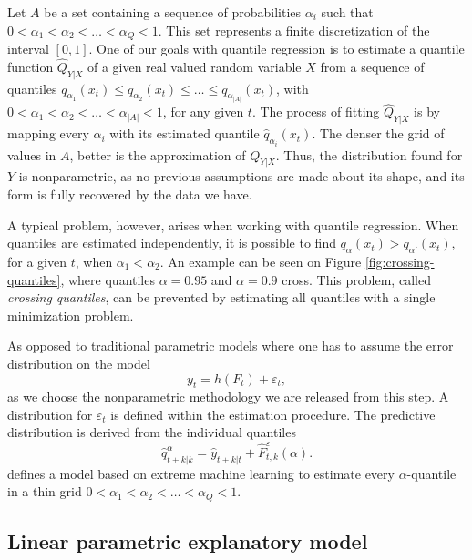 Let $A$ be a set containing a sequence of probabilities  $\alpha_i$ such that $0 < \alpha_1 < \alpha_2 < \dots < \alpha_Q < 1$. This set represents a finite discretization of the interval $[0,1]$.
One of our goals with quantile regression is to estimate a quantile function $\hat{Q}_{Y|X}$ of a given real valued random variable $X$ from a sequence of quantiles $q_{\alpha_1}(x_t) \leq q_{\alpha_2}(x_t) \leq \dots \leq q_{\alpha_{|A|}}(x_t)$, with $0 < \alpha_1 < \alpha_2 < \dots < \alpha_{|A|} < 1$, for any given $t$.
The process of fitting $\hat{Q}_{Y|X}$ is by mapping every $\alpha_i$ with its estimated quantile $\hat{q}_{\alpha_i}(x_t)$.
The denser the grid of values in $A$, better is the approximation of $Q_{Y|X}$.
Thus, the distribution found for $Y$ is nonparametric, as no previous assumptions are made about its shape, and its form is fully recovered by the data we have.

A typical problem, however, arises when working with quantile regression. When quantiles are estimated independently, it is possible to find $q_{\alpha}(x_t) > q_{\alpha'}(x_t)$, for a given $t$, when $\alpha_1 < \alpha_2$. An example can be seen on Figure \ref{fig:crossing-quantiles}, where quantiles $\alpha = 0.95$ and $\alpha = 0.9$ cross. This problem, called \textit{crossing quantiles}, can be prevented by estimating all quantiles with a single minimization problem.



As opposed to traditional parametric models where one has to assume the error distribution on the model
\begin{equation}
y_t = h(F_t) + \varepsilon_t,
\end{equation}
as we choose the nonparametric methodology we are released from this step. A distribution for $\varepsilon_t$ is defined within the estimation procedure. The predictive distribution is derived from the individual quantiles
\begin{equation}
\hat q^\alpha_{t+k|k} = \hat y_{t+k|t} + \hat F^\varepsilon_{t,k}(\alpha).
\end{equation}
\cite{wan_direct_2017} defines a model based on extreme machine learning to estimate every $\alpha$-quantile in a thin grid $0 < \alpha_1 < \alpha_2 < \dots < \alpha_Q < 1$. 
	
	
	
	
	
	
\subsection{Linear parametric explanatory model}
	\blindtext
	
